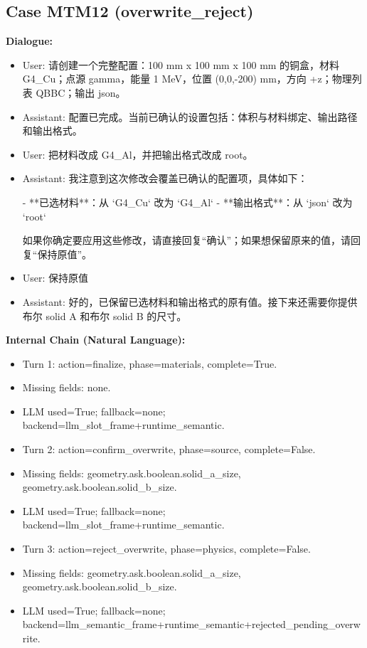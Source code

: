 \documentclass[11pt]{ctexart}
\begin{document}
\subsection{Case MTM12 (overwrite\_reject)}
\textbf{Dialogue:}
\begin{itemize}
\item User: 请创建一个完整配置：100 mm x 100 mm x 100 mm 的铜盒，材料 G4\_Cu；点源 gamma，能量 1 MeV，位置 (0,0,-200) mm，方向 +z；物理列表 QBBC；输出 json。
\item Assistant: 配置已完成。当前已确认的设置包括：体积与材料绑定、输出路径和输出格式。
\item User: 把材料改成 G4\_Al，并把输出格式改成 root。
\item Assistant: 我注意到这次修改会覆盖已确认的配置项，具体如下：

- **已选材料**：从 `G4\_Cu` 改为 `G4\_Al`
- **输出格式**：从 `json` 改为 `root`

如果你确定要应用这些修改，请直接回复“确认”；如果想保留原来的值，请回复“保持原值”。
\item User: 保持原值
\item Assistant: 好的，已保留已选材料和输出格式的原有值。接下来还需要你提供布尔 solid A 和布尔 solid B 的尺寸。
\end{itemize}
\textbf{Internal Chain (Natural Language):}
\begin{itemize}
\item Turn 1: action=finalize, phase=materials, complete=True.
\item Missing fields: none.
\item LLM used=True; fallback=none; backend=llm\_slot\_frame+runtime\_semantic.
\item Turn 2: action=confirm\_overwrite, phase=source, complete=False.
\item Missing fields: geometry.ask.boolean.solid\_a\_size, geometry.ask.boolean.solid\_b\_size.
\item LLM used=True; fallback=none; backend=llm\_slot\_frame+runtime\_semantic.
\item Turn 3: action=reject\_overwrite, phase=physics, complete=False.
\item Missing fields: geometry.ask.boolean.solid\_a\_size, geometry.ask.boolean.solid\_b\_size.
\item LLM used=True; fallback=none; backend=llm\_semantic\_frame+runtime\_semantic+rejected\_pending\_overwrite.
\end{itemize}
\end{document}
